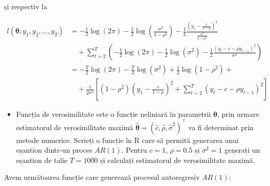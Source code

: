 \documentclass[]{article}
\newenvironment{frshaded*}{%
  \def\FrameCommand{\fboxrule=\FrameRule\fboxsep=\FrameSep \fcolorbox{framecolor}{shadecolor1}}%
  \MakeFramed {\advance\hsize-\width \FrameRestore}}%
{\endMakeFramed}
\newenvironment{rmdblock}[1]
  {\begin{frshaded*}
  \begin{itemize}
  \renewcommand{\labelitemi}{
    \raisebox{-.7\height}[0pt][0pt]{
      {\setkeys{Gin}{width=2em,keepaspectratio}\texttt{[image: images/icons/\#1]}}
    }
  }
  \item
  }
  {
  \end{itemize}
  \end{frshaded*}
  }
\newenvironment{rmdexercise}
  {\begin{rmdblock}{exercise}}
  {\end{rmdblock}}
\begin{document}
și respectiv la

\begin{align*}
 l(\boldsymbol{\theta};y_1,y_2,\ldots,y_T) &= -\frac{1}{2}\log(2\pi) - \frac{1}{2}\log\left(\frac{\sigma^2}{1-\rho^2}\right) -\frac{1}{2}\frac{\left(y_1 - \frac{c}{1-\rho}\right)^2}{\frac{\sigma^2}{1-\rho^2}}\\
       &\quad +\sum_{t = 2}^{T}\left(-\frac{1}{2}\log(2\pi) - \frac{1}{2}\log\left(\sigma^2\right)-\frac{1}{2}\frac{\left(y_t - c-\rho y_{t-1}\right)^2}{\sigma^2}\right)\\
       &= -\frac{T}{2}\log(2\pi) -\frac{T}{2}\log(\sigma^2) + \frac{1}{2}\log(1-\rho^2) +\\
       &\quad+\frac{1}{2\sigma^2}\left[(1-\rho^2)\left(y_1 - \frac{c}{1-\rho}\right)^2 + \sum_{t = 2}^{T}\left(y_t - c-\rho y_{t-1}\right)^2\right]
\end{align*}

\begin{rmdexercise}
Funcția de verosimilitate este o funcție neliniară în parametrii
\(\boldsymbol{\theta}\), prin urmare estimatorul de verosimilitate
maximă
\(\hat{\boldsymbol{\theta}} = (\hat{c}, \hat{\rho}, \hat{\sigma}^2)^\intercal\)
va fi determinat prin metode numerice. Scrieți o funcție în R care să
permită generarea unui eșantion dintr-un proces \(AR(1)\). Pentru
\(c = 1\), \(\rho = 0.5\) și \(\sigma^2 = 1\) generați un eșantion de
talie \(T = 1000\) și calculați estimatorul de verosimilitate maximă.
\end{rmdexercise}

Avem următoarea funcție care generează procesul autoregresiv \(AR(1)\):
\end{document}
